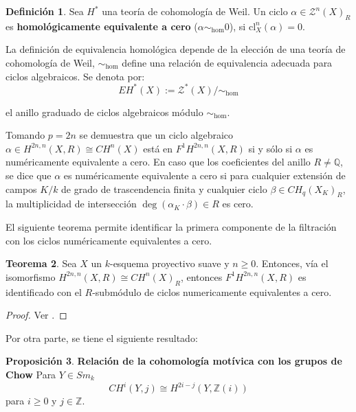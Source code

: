 \documentclass[10pt]{amsart}
\theoremstyle{definition}
\newtheorem{definition}{Definici\'on}[section]
\newtheorem{theorem}[definition]{Teorema}
\newtheorem{proposition}[definition]{Proposici\'on}
\theoremstyle{remark}
\theoremstyle{definition}
\begin{document}
\begin{definition} Sea $H^{*}$ una teoría de cohomología de Weil. Un ciclo $\alpha \in \mathcal{Z}^{n}(X)_{R}$ es \textbf{homológicamente equivalente a cero} ($\alpha \sim_{\mathrm{hom}} 0$), si $\mathrm{cl}^{n}_{X}(\alpha)=0$.
\end{definition}
 La definición de equivalencia homológica depende de la elección de una teoría de cohomología de Weil, $\sim_{\mathrm{hom}}$ define una relación de equivalencia adecuada para ciclos algebraicos. Se denota por:
\begin{equation*}
EH^{*}(X):=\mathcal{Z}^{*}(X)/\sim_{\mathrm{hom}}
\end{equation*}

el anillo graduado de ciclos algebraicos módulo $\sim_{\mathrm{hom}}$.

Tomando $p=2n$ se demuestra que un ciclo algebraico $\alpha \in H^{2n,n}(X,R) \cong CH^{n}(X)$ está en $F^{1}H^{2n,n}(X,R)$ si y sólo si $\alpha$ es numéricamente equivalente a cero. En caso que los coeficientes del anillo $R \neq \mathbb{Q}$, se dice que $\alpha$ es numéricamente equivalente a cero si  para cualquier extensión de campos $K/\mathit{k}$ de grado de trascendencia finita y cualquier ciclo $\beta \in CH_{q}(X_{K})_{R}$, la multiplicidad de intersección $\deg(\alpha_{K} \cdot \beta) \in R$ es cero.

El siguiente teorema permite identificar la primera componente de la filtración con los ciclos numéricamente equivalentes a cero.


\begin{theorem}
Sea $X$ un $\mathit{k}$-esquema proyectivo suave y $n \geq 0$. Entonces, v\'ia el isomorfismo $H^{2n,n}(X,R) \cong CH^{n}(X)_{R}$, entonces $F^{1}H^{2n,n}(X,R)$ es identificado con el $R$-subm\'odulo de ciclos numericamente equivalentes a cero.
\end{theorem}

\begin{proof}
Ver \cite[Thm. 5.3.6]{Pel17}.
\end{proof}

Por otra parte, se tiene el siguiente resultado:
\begin{proposition}
\textbf{Relación de la cohomología motívica con los grupos de Chow} Para $Y \in Sm_{\mathit{k}}$
\begin{equation*}
CH^{i}(Y,j) \cong H^{2i-j}(Y,\mathbb{Z}(i))
\end{equation*}
para $i \geq 0$ y $j \in \mathbb{Z}$.
\end{proposition}
\end{document}
